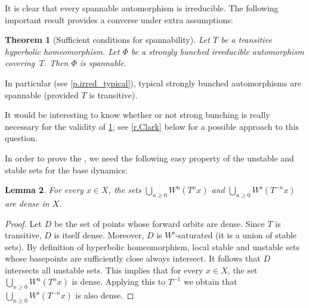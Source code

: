 \documentclass[10pt]{amsart}
\theoremstyle{plain}
\newtheorem{theorem}{Theorem}[section]
\newtheorem{lemma}[theorem]{Lemma}
\theoremstyle{definition}
\newcommand{\uu}{\mathrm{u}}
\renewcommand{\ss}{\mathrm{s}}
\begin{document}
It is clear that every spannable automorphism is irreducible.
The following important result provides a converse under extra assumptions:

\begin{theorem}[Sufficient conditions for spannability]\label{t.irr_to_span}
Let $T$ be a transitive hyperbolic homeomorphism.
Let $\Phi$ be a strongly bunched irreducible automorphism covering~$T$.
Then $\Phi$ is spannable.
\end{theorem}

In particular (see \cref{p.irred_typical}), typical strongly bunched automorphisms are spannable (provided $T$ is transitive).

It would be interesting to know whether or not strong bunching is really necessary for the validity of \cref{t.irr_to_span}; see \cref{r.Clark} below for a possible approach to this question.

In order to prove the , we need the following easy property of the unstable and stable sets for the base dynamics:

\begin{lemma}\label{l.transitive}
For every $x \in X$, the sets $\bigcup_{n \ge 0} W^\uu(T^n x)$ and $\bigcup_{n \ge 0} W^\ss(T^{-n} x)$ are dense in $X$.
\end{lemma}

\begin{proof}
Let $D$ be the set of points whose forward orbits are dense.
Since $T$ is transitive, $D$ is itself dense.
Moreover, $D$ is $W^\ss$-saturated (\ie it is a union of stable sets).
By definition of hyperbolic homeomorphism, local stable and unstable sets whose basepoints are sufficiently close always intersect.
It follows that $D$ intersects all unstable sets.
This implies that for every $x \in X$, the set $\bigcup_{n \ge 0} W^\uu(T^n x)$ is dense.
Applying this to $T^{-1}$ we obtain that $\bigcup_{n \ge 0} W^\ss(T^{-n} x)$ is also dense.
\end{proof}
\end{document}
